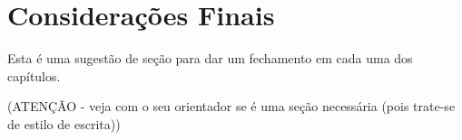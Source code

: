 \section{Considerações Finais}
\label{cap:proposta:consideracoes:finais}

Esta é uma sugestão de seção para dar um fechamento em cada uma dos capítulos.

(ATENÇÃO - veja com o seu orientador se é uma seção necessária (pois trate-se de estilo de escrita))